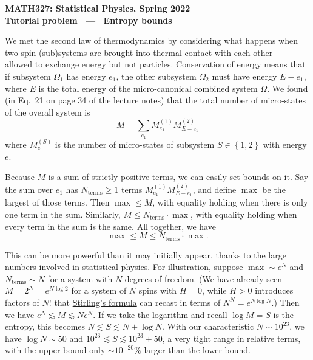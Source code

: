 \documentclass[12 pt]{article} %
\newcommand{\Om}{\ensuremath{\Omega} }
\begin{document}
\newcommand{\thisweek}{MATH327 Tutorial (Bounds)}
\newcommand{\moddate}{Last modified 13 Feb.~2022}
\begin{center}
  {\Large \textbf{MATH327: Statistical Physics, Spring 2022}} \\[12 pt]
  {\Large \textbf{Tutorial problem \ --- \ Entropy bounds}} \\[24 pt]
\end{center}

We met the second law of thermodynamics by considering what happens when two spin (sub)systems are brought into thermal contact with each other --- allowed to exchange energy but not particles.
Conservation of energy means that if subsystem $\Om_1$ has energy $e_1$, the other subsystem $\Om_2$ must have energy $E - e_1$, where $E$ is the total energy of the micro-canonical combined system $\Om$.
We found (in Eq.~21 on page 34 of the lecture notes) that the total number of micro-states of the overall system is
\begin{equation*}
  M = \sum_{e_1} M_{e_1}^{(1)} M_{E - e_1}^{(2)}
\end{equation*}
where $M_e^{(S)}$ is the number of micro-states of subsystem $S \in \left\{1, 2\right\}$ with energy $e$.

Because $M$ is a sum of strictly positive terms, we can easily set bounds on it.
Say the sum over $e_1$ has $N_{\text{terms}} \geq 1$ terms $M_{e_1}^{(1)} M_{E - e_1}^{(2)}$, and define $\max$ be the largest of those terms.
Then $\max \leq M$, with equality holding when there is only one term in the sum.
Similarly, $M \leq N_{\text{terms}} \cdot \max$, with equality holding when every term in the sum is the same.
All together, we have
\begin{equation*}
  \max \leq M \leq N_{\text{terms}} \cdot \max.
\end{equation*}

This can be more powerful than it may initially appear, thanks to the large numbers involved in statistical physics.
For illustration, suppose $\max \sim e^N$ and $N_{\text{terms}} \sim N$ for a system with $N$ degrees of freedom.
(We have already seen $M = 2^N = e^{N\log 2}$ for a system of $N$ spins with $H = 0$, while $H > 0$ introduces factors of $N!$ that \href{https://en.wikipedia.org/wiki/Stirling's_approximation}{Stirling's formula} can recast in terms of $N^N = e^{N\log N}$.)
Then we have $e^N \lesssim M \lesssim N e^N$.
If we take the logarithm and recall $\log M = S$ is the entropy, this becomes $N \lesssim S \lesssim N + \log N$.
With our characteristic $N \sim 10^{23}$, we have $\log N \sim 50$ and $10^{23} \lesssim S \lesssim 10^{23} + 50$, a very tight range in relative terms, with the upper bound only $\sim$$10^{-20}\%$ larger than the lower bound.
\end{document}
